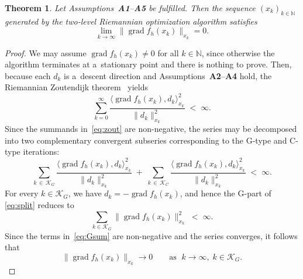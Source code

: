 \documentclass[11pt,reqno]{amsart}
\theoremstyle{plain}
\newtheorem{thm}{Theorem}[section] %
\newcommand\N{\mathbb N}
\DeclareMathOperator{\grad}{grad}
\newcommand\calK{\mathcal K}
\begin{document}
	\begin{thm}\label{thm:conv}
		Let Assumptions~\textup{\textbf{A1}--\textbf{A5}} be fulfilled. Then the sequence $(x_k)_{k\in\N}$ generated by the two-level Riemannian optimization algorithm satisfies
		\begin{equation}\label{eq:conv_grad}
			\lim_{k \to \infty} \|\grad f_h(x_k)\|_{x_k} = 0.
		\end{equation}
	\end{thm}
	\begin{proof}
		We may assume $\grad f_h(x_k) \neq 0$ for all $k\in\N$, since otherwise the algorithm terminates at a~stationary point and there is nothing to prove. Then, because each $d_k$ is a~descent direction and Assumptions~\textbf{A2}--\textbf{A4} hold,
		the Riemannian Zoutendijk theorem~\cite[Thm.~2]{RiWi2012} yields
		\begin{equation}\label{eq:zout}
			\sum_{k=0}^{\infty}
			\frac{\langle \grad f_h(x_k), d_k\rangle_{x_k}^{2}}{\|d_k\|_{x_k}^{2}}
			\;<\; \infty.
		\end{equation}
		Since the summands in~\eqref{eq:zout} are non-negative, the series may be decomposed into two complementary convergent subseries corresponding to the G-type and C-type iterations:
		\begin{equation}\label{eq:split}
			\sum_{k\,\in\,\calK_G}
			\frac{\langle \grad f_h(x_k), d_k\rangle_{x_k}^{2}}{\|d_k\|_{x_k}^{2}}
			\;+\;
			\sum_{k\,\in\,\calK_C}
			\frac{\langle \grad f_h(x_k), d_k\rangle_{x_k}^{2}}{\|d_k\|_{x_k}^{2}}
			\;<\; \infty.
		\end{equation}
		For every $k\in\calK_G$, we have $d_k = -\grad f_h(x_k)$, and hence 
		the G-part of \eqref{eq:split} reduces to 
		\begin{equation}\label{eq:Gsum}
			\sum_{k\in\calK_G} \|\grad f_h(x_k)\|_{x_k}^{2} \;<\; \infty.
		\end{equation}
		Since the terms in~\eqref{eq:Gsum} are non-negative and the series converges, it follows that 
		\begin{equation}\label{eq:Gconv}
			\|\grad f_h(x_k)\|_{x_k} \rightarrow 0\qquad \text{as } \;k\rightarrow\infty, \; k\in\calK_G.
		\end{equation}
		

\end{proof}
\end{document}
